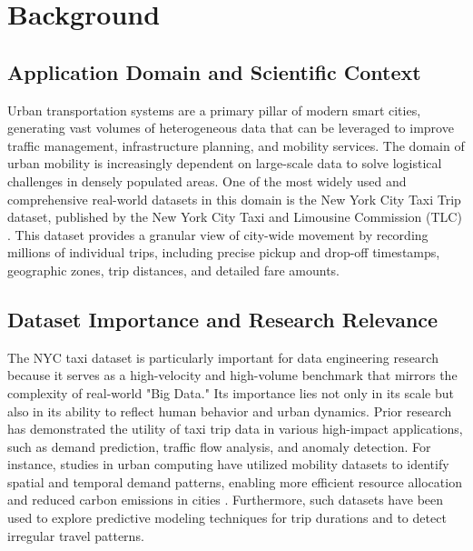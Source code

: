 \section{Background}
\label{sec:background}

\subsection{Application Domain and Scientific Context}
Urban transportation systems are a primary pillar of modern smart cities, generating vast volumes of heterogeneous data that can be leveraged to improve traffic management, infrastructure planning, and mobility services. The domain of urban mobility is increasingly dependent on large-scale data to solve logistical challenges in densely populated areas. One of the most widely used and comprehensive real-world datasets in this domain is the New York City Taxi Trip dataset, published by the New York City Taxi and Limousine Commission (TLC) \cite{TLC2024}. This dataset provides a granular view of city-wide movement by recording millions of individual trips, including precise pickup and drop-off timestamps, geographic zones, trip distances, and detailed fare amounts.

\subsection{Dataset Importance and Research Relevance}
The NYC taxi dataset is particularly important for data engineering research because it serves as a high-velocity and high-volume benchmark that mirrors the complexity of real-world "Big Data." Its importance lies not only in its scale but also in its ability to reflect human behavior and urban dynamics. Prior research has demonstrated the utility of taxi trip data in various high-impact applications, such as demand prediction, traffic flow analysis, and anomaly detection. For instance, studies in urban computing have utilized mobility datasets to identify spatial and temporal demand patterns, enabling more efficient resource allocation and reduced carbon emissions in cities \cite{Andrienko2013}. Furthermore, such datasets have been used to explore predictive modeling techniques for trip durations and to detect irregular travel patterns. 

